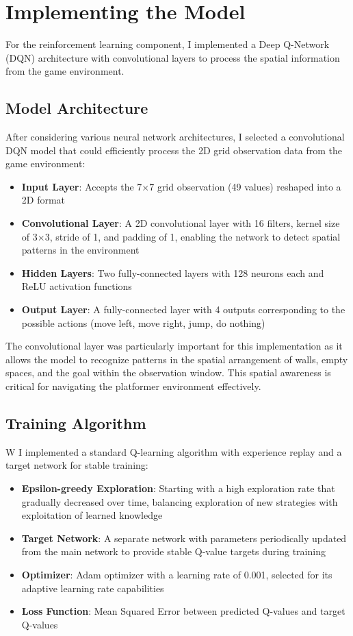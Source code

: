 \section{Implementing the Model}

For the reinforcement learning component, I implemented a Deep Q-Network (DQN) architecture with convolutional layers to process the spatial information from the game environment.

\subsection{Model Architecture}

After considering various neural network architectures, I selected a convolutional DQN model that could efficiently process the 2D grid observation data from the game environment:

\begin{itemize}
    \item \textbf{Input Layer}: Accepts the 7×7 grid observation (49 values) reshaped into a 2D format
    \item \textbf{Convolutional Layer}: A 2D convolutional layer with 16 filters, kernel size of 3×3, stride of 1, and padding of 1, enabling the network to detect spatial patterns in the environment
    \item \textbf{Hidden Layers}: Two fully-connected layers with 128 neurons each and ReLU activation functions
    \item \textbf{Output Layer}: A fully-connected layer with 4 outputs corresponding to the possible actions (move left, move right, jump, do nothing)
\end{itemize}

The convolutional layer was particularly important for this implementation as it allows the model to recognize patterns in the spatial arrangement of walls, empty spaces, and the goal within the observation window. 
This spatial awareness is critical for navigating the platformer environment effectively.

\subsection{Training Algorithm}
W
I implemented a standard Q-learning algorithm with experience replay and a target network for stable training:

\begin{itemize}
    \item \textbf{Epsilon-greedy Exploration}: Starting with a high exploration rate that gradually decreased over time, balancing exploration of new strategies with exploitation of learned knowledge
    \item \textbf{Target Network}: A separate network with parameters periodically updated from the main network to provide stable Q-value targets during training
    \item \textbf{Optimizer}: Adam optimizer with a learning rate of 0.001, selected for its adaptive learning rate capabilities
    \item \textbf{Loss Function}: Mean Squared Error between predicted Q-values and target Q-values
\end{itemize}

